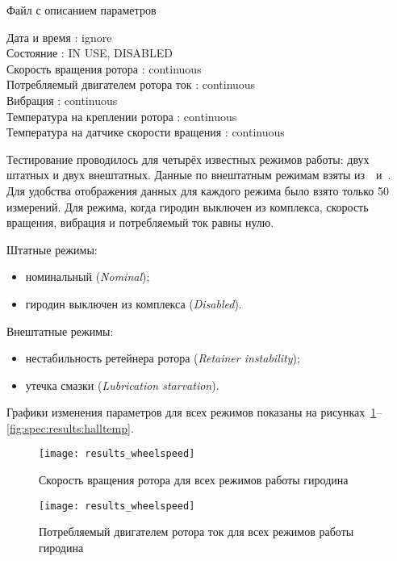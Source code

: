 \begin{algorithm}[h!]
\caption{Файл с описанием параметров}
\label{lst:spec:results:params}
\raggedright
\addtolength{\leftskip}{5mm}
\smallskip
Дата и время : ignore \\
Состояние : IN USE, DISABLED \\
Скорость вращения ротора : continuous \\
Потребляемый двигателем ротора ток : continuous \\
Вибрация : continuous \\
Температура на креплении ротора : continuous \\
Температура на датчике скорости вращения : continuous \\
\end{algorithm}

Тестирование проводилось для четырёх известных режимов работы: двух штатных и двух внештатных. Данные по внештатным режимам взяты из~\cite{ISSCMGFailureAnalysis}~и~\cite{ISSCMGLessonsLearned}. Для удобства отображения данных для каждого режима было взято только 50 измерений. Для режима, когда гиродин выключен из комплекса, скорость вращения, вибрация и потребляемый ток равны нулю.

Штатные режимы:
\begin{itemize}
	\item номинальный (\textit{Nominal});
	\item гиродин выключен из комплекса (\textit{Disabled}).
\end{itemize}

Внештатные режимы:
\begin{itemize}
	\item нестабильность ретейнера ротора (\textit{Retainer instability});
	\item утечка смазки (\textit{Lubrication starvation}).
\end{itemize}

Графики изменения параметров для всех режимов показаны на рисунках~\ref{fig:spec:results:wheelspeed}--\ref{fig:spec:results:halltemp}.

\begin{figure}[h]
\texttt{[image: results\_wheelspeed]}
\caption{Скорость вращения ротора для всех режимов работы гиродина}
\label{fig:spec:results:wheelspeed}
\end{figure}

\begin{figure}[h]
\texttt{[image: results\_wheelspeed]}
\caption{Потребляемый двигателем ротора ток для всех режимов работы гиродина}
\label{fig:spec:results:current}
\end{figure}

